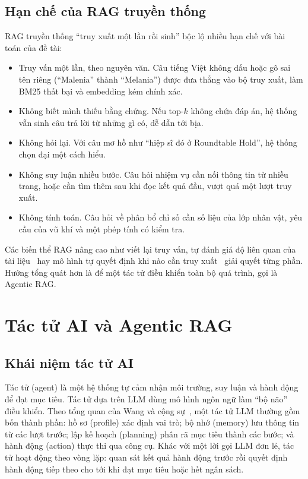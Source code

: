 \subsection{Hạn chế của RAG truyền thống}
\label{sec:rag_limits}

RAG truyền thống ``truy xuất một lần rồi sinh'' bộc lộ nhiều hạn chế với bài toán của đề tài:
\begin{itemize}
    \item Truy vấn một lần, theo nguyên văn. Câu tiếng Việt không dấu hoặc gõ sai tên riêng (``Malenia'' thành ``Melania'') được đưa thẳng vào bộ truy xuất, làm BM25 thất bại và embedding kém chính xác.
    \item Không biết mình thiếu bằng chứng. Nếu top-$k$ không chứa đáp án, hệ thống vẫn sinh câu trả lời từ những gì có, dễ dẫn tới bịa.
    \item Không hỏi lại. Với câu mơ hồ như ``hiệp sĩ đó ở Roundtable Hold'', hệ thống chọn đại một cách hiểu.
    \item Không suy luận nhiều bước. Câu hỏi nhiệm vụ cần nối thông tin từ nhiều trang, hoặc cần tìm thêm sau khi đọc kết quả đầu, vượt quá một lượt truy xuất.
    \item Không tính toán. Câu hỏi về phân bổ chỉ số cần số liệu của lớp nhân vật, yêu cầu của vũ khí và một phép tính có kiểm tra.
\end{itemize}
Các biến thể RAG nâng cao như viết lại truy vấn, tự đánh giá độ liên quan của tài liệu~\cite{yan2024crag} hay mô hình tự quyết định khi nào cần truy xuất~\cite{asai2024selfrag} giải quyết từng phần. Hướng tổng quát hơn là để một tác tử điều khiển toàn bộ quá trình, gọi là Agentic RAG.

\section{Tác tử AI và Agentic RAG}
\label{sec:agent}

\subsection{Khái niệm tác tử AI}
\label{sec:agent_def}

Tác tử (agent) là một hệ thống tự cảm nhận môi trường, suy luận và hành động để đạt mục tiêu. Tác tử dựa trên LLM dùng mô hình ngôn ngữ làm ``bộ não'' điều khiển. Theo tổng quan của Wang và cộng sự~\cite{wang2024agentsurvey}, một tác tử LLM thường gồm bốn thành phần: hồ sơ (profile) xác định vai trò; bộ nhớ (memory) lưu thông tin từ các lượt trước; lập kế hoạch (planning) phân rã mục tiêu thành các bước; và hành động (action) thực thi qua công cụ. Khác với một lời gọi LLM đơn lẻ, tác tử hoạt động theo vòng lặp: quan sát kết quả hành động trước rồi quyết định hành động tiếp theo cho tới khi đạt mục tiêu hoặc hết ngân sách.

